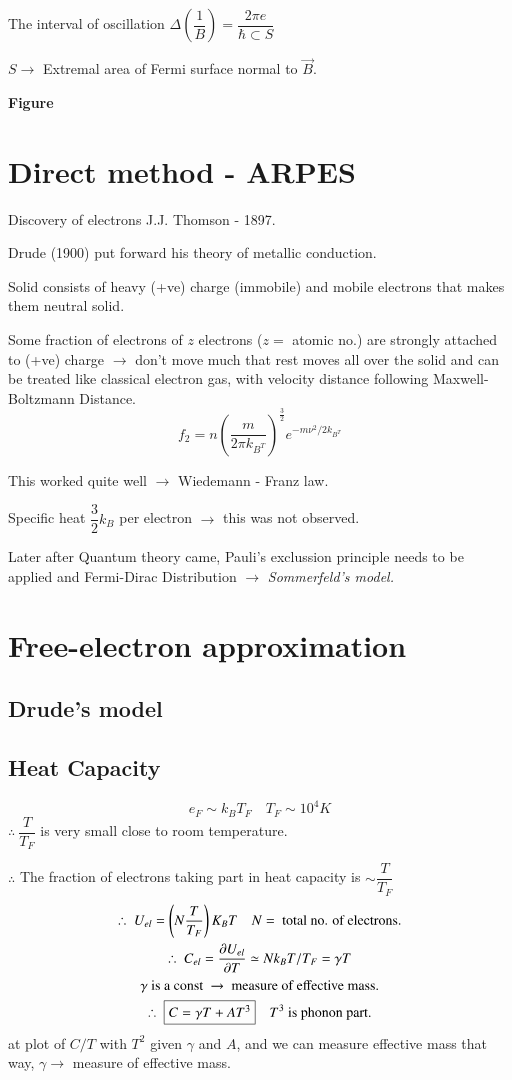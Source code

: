 The interval of oscillation $\Delta\left(\dfrac{1}{B}\right)=\dfrac{2\pi e}{\hbar \subset S}$

$S\to$ Extremal area of Fermi surface normal to $\overrightarrow{B}$.
\begin{center}
{\bf Figure}
\end{center}

\section*{Direct method - ARPES}

Discovery of electrons J.J. Thomson - 1897.

Drude (1900) put forward his theory of metallic conduction.

Solid consists of heavy (+ve) charge (immobile) and mobile electrons that makes them neutral solid.

Some fraction of electrons of $z$ electrons ($z=$ atomic no.) are strongly attached to (+ve) charge $\to$ don't move much that rest moves all over the solid and can be treated like classical electron gas, with velocity distance following Maxwell- Boltzmann Distance.
$$
f_{2}=n\left(\dfrac{m}{2\pi k_{B^{T}}}\right)^{\frac{3}{2}}e^{-m\nu^{2}/2k_{B^{T}}}
$$

This worked quite well $\to$ Wiedemann - Franz law.

Specific heat $\dfrac{3}{2}k_{B}$ per electron $\to$ this was not observed.

Later after Quantum theory came, Pauli's exclussion principle needs to be applied and Fermi-Dirac Distribution $\to$ {\em Sommerfeld's model.}

\section*{Free-electron approximation}

\subsection*{Drude's model}

\subsection*{Heat Capacity}
$$
e_{F}\sim k_{B}T_{F}\quad T_{F}\sim 10^{4}K
$$
$\therefore \ \dfrac{T}{T_{F}}$ is very small close to room temperature.

$\therefore$ The fraction of electrons taking part in heat capacity is $\sim \dfrac{T}{T_{F}}$
\begin{gather*}
\therefore \ U_{el}=\left(N\dfrac{T}{T_{F}}\right)K_{B}T\quad N= \text{ total no. of electrons.}\\
\therefore \ C_{el}=\dfrac{\partial U_{el}}{\partial T}\simeq N k_{B}T/T_{F}=\gamma T\\
\gamma \text{ is a const } \to \text{ measure of effective mass.}\\
\therefore \ \fbox{$C=\gamma T+AT^{3}$}\quad T^{3} \text{ is phonon part.}
\end{gather*}
at plot of $C/T$ with $T^{2}$ given $\gamma$ and $A$, and we can measure effective mass that way, $\gamma\to$ measure of effective mass.

